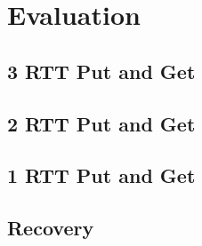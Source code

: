 \section{Evaluation}
\subsection{3 RTT Put and Get}
\subsection{2 RTT Put and Get}
\subsection{1 RTT Put and Get}
\subsection{Recovery}
